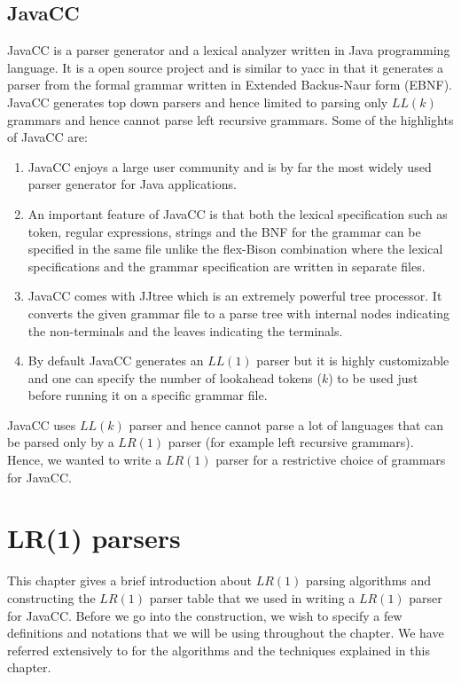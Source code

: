 \documentclass[oneside]{book}
\begin{document}
\section{JavaCC}
JavaCC is a parser generator and a lexical analyzer written in Java programming language. It is a open source project and is similar to yacc in that it generates a parser from the formal grammar written in Extended Backus-Naur form (EBNF). JavaCC generates top down parsers and hence limited to parsing only $LL(k)$ grammars and hence cannot parse left recursive grammars. Some of the highlights of JavaCC are:

\begin{enumerate}
\item JavaCC enjoys a large user community and is by far the most widely used parser generator for Java applications.
\item An important feature of JavaCC is that both the lexical specification such as token, regular expressions, strings and the BNF for the grammar can be specified in the same file unlike the flex-Bison combination where the lexical specifications and the grammar specification are written in separate files.
\item JavaCC comes with JJtree which is an extremely powerful tree processor. It converts the given grammar file to a parse tree with internal nodes indicating the non-terminals and the leaves indicating the terminals.
\item By default JavaCC generates an $LL(1)$ parser but it is highly customizable and one can specify the number of lookahead tokens ($k$) to be used just before running it on a specific grammar file.  
\end{enumerate}
 
 JavaCC uses $LL(k)$ parser and hence cannot parse a lot of languages that can be parsed only by a $LR(1)$ parser (for example left recursive grammars). Hence, we wanted to write a $LR(1)$ parser for a restrictive choice of grammars for JavaCC.
 
 \chapter{LR(1) parsers}

This chapter gives a brief introduction about $LR(1)$ parsing algorithms and constructing the $LR(1)$ parser table that we used in writing a $LR(1)$ parser for JavaCC. Before we go into the construction, we wish to specify a few definitions and notations that we will be using throughout the chapter. We have referred extensively to \cite{aho1985} for the algorithms and the techniques explained in this chapter.
\end{document}
